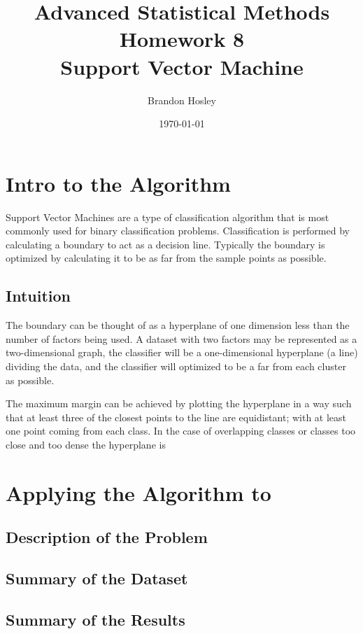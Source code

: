 \documentclass[a4paper,man,natbib]{apa6}
\title{Advanced Statistical Methods Homework 8 \\ Support Vector Machine}
\author{Brandon Hosley}
\date{\today}
\affiliation{University of Illinois - Springfield}
\begin{document}
\maketitle
\singlespacing

\section{Intro to the Algorithm}

Support Vector Machines are a type of classification algorithm that is most commonly used for binary classification problems. Classification is performed by calculating a boundary to act as a decision line. Typically the boundary is optimized by calculating it to be as far from the sample points as possible.

\subsection{Intuition}

The boundary can be thought of as a hyperplane of one dimension less than the number of factors being used. A dataset with two factors may be represented as a two-dimensional graph, the classifier will be a one-dimensional hyperplane (a line) dividing the data, and the classifier will optimized to be a far from each cluster as possible.

The maximum margin can be achieved by plotting the hyperplane in a way such that at least three of the closest points to the line are equidistant; with at least one point coming from each class. In the case of overlapping classes or classes too close and too dense the hyperplane is 

\section{Applying the Algorithm to }
\subsection{Description of the Problem}
\subsection{Summary of the Dataset}
\subsection{Summary of the Results}
\end{document}
